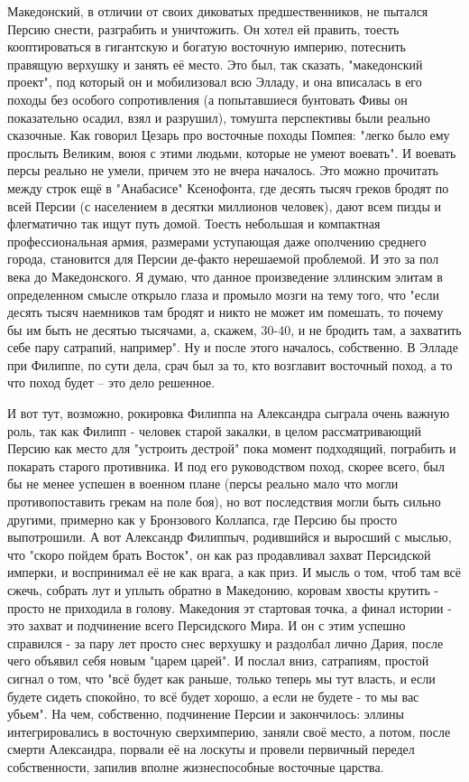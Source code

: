 Македонский, в отличии от своих диковатых предшественников, не пытался Персию снести, разграбить и уничтожить. Он хотел ей править, тоесть кооптироваться в гигантскую и богатую восточную империю, потеснить правящую верхушку и занять её место. Это был, так сказать, "македонский проект", под который он и мобилизовал всю Элладу, и она вписалась в его походы без особого сопротивления (а попытавшиеся бунтовать Фивы он показательно осадил, взял и разрушил), томушта перспективы были реально сказочные. Как говорил Цезарь про восточные походы Помпея: "легко было ему прослыть Великим, воюя с этими людьми, которые не умеют воевать". И воевать персы реально не умели, причем это не вчера началось. Это можно прочитать между строк ещё в "Анабасисе" Ксенофонта, где десять тысяч греков бродят по всей Персии (с населением в десятки миллионов человек), дают всем пизды и флегматично так ищут путь домой. Тоесть небольшая и компактная профессиональная армия, размерами уступающая даже ополчению среднего города, становится для Персии де-факто нерешаемой проблемой. И это за пол века до Македонского. Я думаю, что данное произведение эллинским элитам в определенном смысле открыло глаза и промыло мозги на тему того, что "если десять тысяч наемников там бродят и никто не может им помешать, то почему бы им быть не десятью тысячами, а, скажем, 30-40, и не бродить там, а захватить себе пару сатрапий, например". Ну и после этого началось, собственно. В Элладе при Филиппе, по сути дела, срач был за то, кто возглавит восточный поход, а то что поход будет – это дело решенное.


И вот тут, возможно, рокировка Филиппа на Александра сыграла очень важную роль, так как Филипп - человек старой закалки, в целом рассматривающий Персию как место для "устроить дестрой" пока момент подходящий, пограбить и покарать старого противника. И под его руководством поход, скорее всего, был бы не менее успешен в военном плане (персы реально мало что могли противопоставить грекам на поле боя), но вот последствия могли быть сильно другими, примерно как у Бронзового Коллапса, где Персию бы просто выпотрошили. А вот Александр Филиппыч, родившийся и выросший с мыслью, что "скоро пойдем брать Восток", он как раз продавливал захват Персидской имперки, и воспринимал её не как врага, а как приз. И мысль о том, чтоб там всё сжечь, собрать лут и уплыть обратно в Македонию, коровам хвосты крутить - просто не приходила в голову. Македония эт стартовая точка, а финал истории - это захват и подчинение всего Персидского Мира. И он с этим успешно справился - за пару лет просто снес верхушку и раздолбал лично Дария, после чего объявил себя новым "царем царей". И послал вниз, сатрапиям, простой сигнал о том, что "всё будет как раньше, только теперь мы тут власть, и если будете сидеть спокойно, то всё будет хорошо, а если не будете - то мы вас убьем". На чем, собственно, подчинение Персии и закончилось: эллины интегрировались в восточную сверхимперию, заняли своё место, а потом, после смерти Александра, порвали её на лоскуты и провели первичный передел собственности, запилив вполне жизнеспособные восточные царства.


